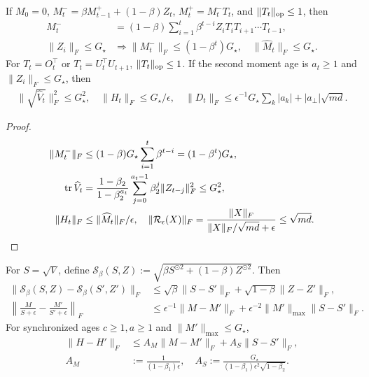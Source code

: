 \begin{lemma}\label{lem:rigid-moment}
If $M_0=0$, $M_t^-=\beta M_{t-1}^++(1-\beta)Z_t$, $M_t^+=M_t^-T_t$, and
$\|T_t\|_{\mathrm{op}}\le1$, then
\begin{align}
 M_t^-&=(1-\beta)\sum_{i=1}^t\beta^{t-i}Z_iT_iT_{i+1}\cdots T_{t-1},\\
 \|Z_i\|_F\le G_\star
 &\Longrightarrow\|M_t^-\|_F\le(1-\beta^t)G_\star,\quad
 \|\widehat M_t\|_F\le G_\star.
\end{align}
For $T_t=O_t^\top$ or $T_t=U_t^\top U_{t+1}$, $\|T_t\|_{\mathrm{op}}\le1$. If the second
moment age is $a_t\ge1$ and $\|Z_i\|_F\le G_\star$, then
\begin{gather}
 \|\sqrt{\widehat V_t}\|_F^2\le G_\star^2,\quad
 \|H_t\|_F\le G_\star/\epsilon,\quad
 \|D_t\|_F\le\epsilon^{-1}G_\star\sum_k|a_k|+|a_\perp|\sqrt{md}.
\end{gather}
\end{lemma}
\begin{proof}
\begin{align}
 \|M_t^-\|_F&\le(1-\beta)G_\star\sum_{i=1}^t\beta^{t-i}
 =(1-\beta^t)G_\star,\\
 \operatorname{tr}\widehat V_t&=\frac{1-\beta_2}{1-\beta_2^{a_t}}
                 \sum_{j=0}^{a_t-1}\beta_2^j\|Z_{t-j}\|_F^2\le G_\star^2,\\
 \|H_t\|_F&\le\|\widehat M_t\|_F/\epsilon,\quad
 \|\mathcal R_\epsilon(X)\|_F
 =\frac{\|X\|_F}{\|X\|_F/\sqrt{md}+\epsilon}\le\sqrt{md}.
\end{align}
\end{proof}
\begin{lemma}\label{lem:rigid-root}
For $S=\sqrt V$, define
$\mathcal S_\beta(S,Z):=\sqrt{\beta S^{\odot2}+(1-\beta)Z^{\odot2}}$. Then
\begin{align}
 \|\mathcal S_\beta(S,Z)-\mathcal S_\beta(S',Z')\|_F
 &\le\sqrt\beta\|S-S'\|_F+\sqrt{1-\beta}\|Z-Z'\|_F,\\
 \left\|\frac{M}{S+\epsilon}-\frac{M'}{S'+\epsilon}\right\|_F
 &\le\epsilon^{-1}\|M-M'\|_F+
          \epsilon^{-2}\|M'\|_{\max}\|S-S'\|_F.
\end{align}
For synchronized ages $c\ge1,a\ge1$ and $\|M'\|_{\max}\le G_\star$,
\begin{align}
 \|H-H'\|_F&\le A_M\|M-M'\|_F+A_S\|S-S'\|_F,\\
 A_M&:=\frac1{(1-\beta_1)\epsilon},\quad
 A_S:=\frac{G_\star}{(1-\beta_1)\epsilon^2\sqrt{1-\beta_2}}.
\end{align}
\end{lemma}
